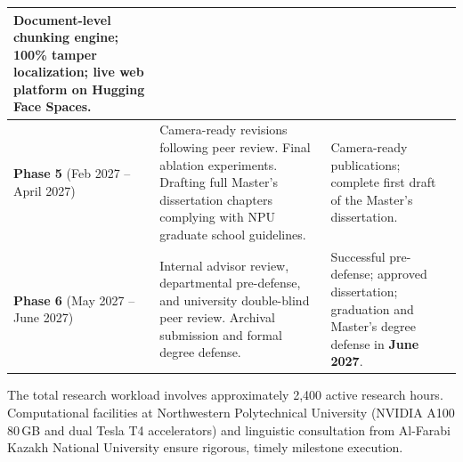 \begin{table}[!htbp]
\begin{tabularx}{\textwidth}{|p{}|X|p{}|}
Document-level chunking engine; 100\% tamper localization; live web platform on Hugging Face Spaces. \\
\hline
\textbf{Phase 5} \newline (Feb 2027 -- April 2027) & 
Camera-ready revisions following peer review. Final ablation experiments. Drafting full Master's dissertation chapters complying with NPU graduate school guidelines. & 
Camera-ready publications; complete first draft of the Master's dissertation. \\
\hline
\textbf{Phase 6} \newline (May 2027 -- June 2027) & 
Internal advisor review, departmental pre-defense, and university double-blind peer review. Archival submission and formal degree defense. & 
Successful pre-defense; approved dissertation; graduation and Master's degree defense in \textbf{June 2027}. \\
\hline
\end{tabularx}
\end{table}

The total research workload involves approximately 2,400 active research hours. Computational facilities at Northwestern Polytechnical University (NVIDIA A100 80\,GB and dual Tesla T4 accelerators) and linguistic consultation from Al-Farabi Kazakh National University ensure rigorous, timely milestone execution.

